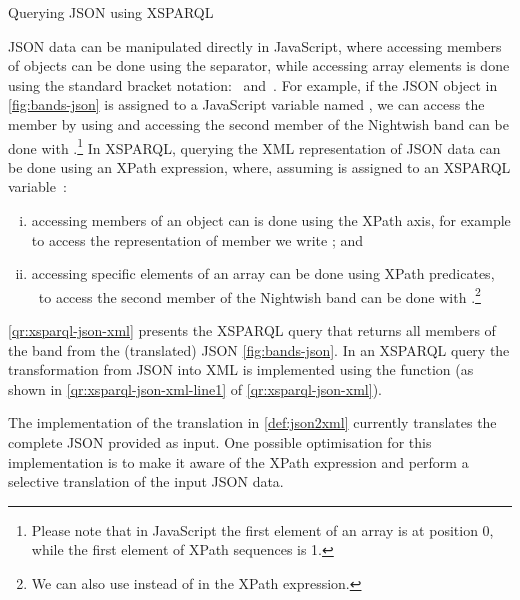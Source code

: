 \begin{query}[t]
  \centering
  
  \caption{Querying JSON using XSPARQL}
  \label{qr:xsparql-json-xml}
\end{query}
%
\ac{JSON} data can be manipulated directly in JavaScript, where accessing members of objects can be done using the
 separator, while accessing array elements is done using the standard bracket notation:~\lit{[} and~\lit{]}.
%
For example, if the \ac{JSON} object in \cref{fig:bands-json} is assigned to a JavaScript variable named , we
can access the member  by using  and accessing the second member of the Nightwish band can be
done with .\footnote{Please note that in JavaScript the first element of an array is
  at position 0, while the first element of XPath sequences is 1.}
%
In XSPARQL, querying the \ac{XML} representation of \ac{JSON} data can be done using an XPath expression, where,
assuming  is assigned to an XSPARQL variable~:
%
\begin{enumerate}[(i),noitemsep]
\item accessing members of an object can is done using the  XPath axis, for example to access the
  representation of member  we write ; and
\item accessing specific elements of an array can be done using XPath predicates, \eg~to access the second member of the
  Nightwish band can be done with .\footnote{We can also use
     instead of \lit{*} in the XPath expression.}
\end{enumerate}
%
\begin{example}
  \cref{qr:xsparql-json-xml} presents the XSPARQL query that returns all members of the 
  band from the (translated) \ac{JSON} \cref{fig:bands-json}.
  In an XSPARQL query the transformation from \ac{JSON} into \ac{XML} is implemented using the
   function (as shown in \cref{qr:xsparql-json-xml-line1} of
  \cref{qr:xsparql-json-xml}).
\end{example}
%
The implementation of the translation in \cref{def:json2xml} currently translates the complete \ac{JSON}
provided as input.  One possible optimisation for this implementation is to make it aware of the \ac{XPath} expression
and perform a selective translation of the input \ac{JSON} data.



